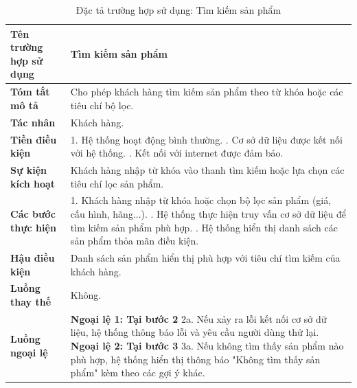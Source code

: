 {
\begin{longtable}{|>{\bfseries}p{4cm}|p{11.5cm}|}
\caption{Đặc tả trường hợp sử dụng: Tìm kiếm sản phẩm}
\label{tab:uc-search-product} \\
\hline
\textbf{Tên trường hợp sử dụng} & Tìm kiếm sản phẩm \\
\hline
\textbf{Tóm tắt mô tả} & Cho phép khách hàng tìm kiếm sản phẩm theo từ khóa hoặc các tiêu chí bộ lọc. \\
\hline
\textbf{Tác nhân} & Khách hàng. \\
\hline
\textbf{Tiền điều kiện} & 1. Hệ thống hoạt động bình thường. \newline
2. Cơ sở dữ liệu được kết nối với hệ thống. \newline
3. Kết nối với internet được đảm bảo. \\
\hline
\textbf{Sự kiện kích hoạt} & Khách hàng nhập từ khóa vào thanh tìm kiếm hoặc lựa chọn các tiêu chí lọc sản phẩm. \\
\hline
\textbf{Các bước thực hiện} & 1. Khách hàng nhập từ khóa hoặc chọn bộ lọc sản phẩm (giá, cấu hình, hãng...). \newline
2. Hệ thống thực hiện truy vấn cơ sở dữ liệu để tìm kiếm sản phẩm phù hợp. \newline
3. Hệ thống hiển thị danh sách các sản phẩm thỏa mãn điều kiện. \\
\hline
\textbf{Hậu điều kiện} & Danh sách sản phẩm hiển thị phù hợp với tiêu chí tìm kiếm của khách hàng. \\
\hline
\textbf{Luồng thay thế} & Không. \\
\hline
\textbf{Luồng ngoại lệ} & \textbf{Ngoại lệ 1: Tại bước 2} \newline
2a. Nếu xảy ra lỗi kết nối cơ sở dữ liệu, hệ thống thông báo lỗi và yêu cầu người dùng thử lại. \newline
\textbf{Ngoại lệ 2: Tại bước 3} \newline
3a. Nếu không tìm thấy sản phẩm nào phù hợp, hệ thống hiển thị thông báo "Không tìm thấy sản phẩm" kèm theo các gợi ý khác. \\
\hline
\end{longtable}

}
